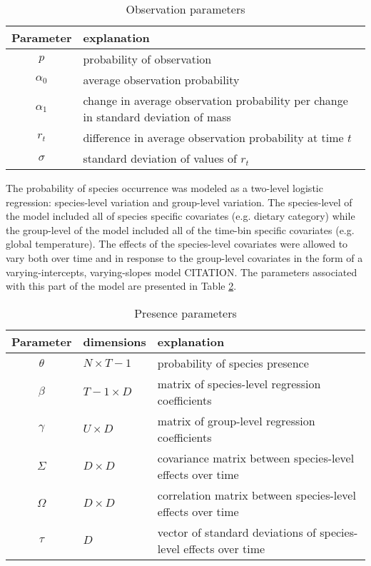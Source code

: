 \documentclass[12pt,letterpaper]{article}
\begin{document}
\begin{table}
  \centering
  \begin{tabular}{c l}
    Parameter & explanation \\
    \hline
    \(p\) & probability of observation \\
    \(\alpha_{0}\) & average observation probability \\
    \(\alpha_{1}\) & change in average observation probability per change in standard deviation of mass \\
    \(r_{t}\) & difference in average observation probability at time \(t\) \\
    \(\sigma\) & standard deviation of values of \(r_{t}\) \\
  \end{tabular}
  \caption{Observation parameters}
  \label{tab:obs_param}
\end{table}


The probability of species occurrence was modeled as a two-level logistic regression: species-level variation and group-level variation. The species-level of the model included all of species specific covariates (e.g. dietary category) while the group-level of the model included all of the time-bin specific covariates (e.g. global temperature). The effects of the species-level covariates were allowed to vary both over time and in response to the group-level covariates in the form of a varying-intercepts, varying-slopes model CITATION. The parameters associated with this part of the model are presented in Table \ref{tab:pres_param}.

\begin{table}
  \centering
  \begin{tabular}{c l l}
    Parameter & dimensions & explanation \\
    \hline
    \(\theta\) & \(N \times T - 1\) & probability of species presence \\
    \(\beta\) & \(T - 1 \times D\) & matrix of species-level regression coefficients \\
    \(\gamma\) & \(U \times D\) & matrix of group-level regression coefficients \\
    \(\Sigma\) & \(D \times D\) & covariance matrix between species-level effects over time \\
    \(\Omega\) & \(D \times D\) & correlation matrix between species-level effects over time \\
    \(\tau\) & \(D\) & vector of standard deviations of species-level effects over time\\
  \end{tabular}
  \caption{Presence parameters}
  \label{tab:pres_param}
\end{table}
\end{document}
